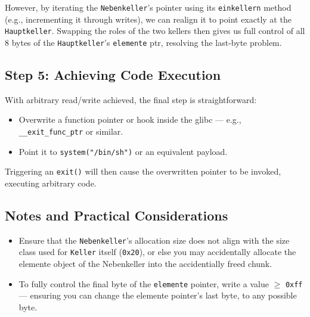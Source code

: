 \documentclass[a4paper,11pt]{article}
\begin{document}
However, by iterating the \texttt{Nebenkeller}'s pointer using its \texttt{einkellern} method (e.g., incrementing it through writes), we can realign it to point exactly at the \texttt{Hauptkeller}. Swapping the roles of the two kellers then gives us full control of all 8 bytes of the \texttt{Hauptkeller}'s \texttt{elemente} ptr, resolving the last-byte problem.

\subsection*{Step 5: Achieving Code Execution}

With arbitrary read/write achieved, the final step is straightforward:
\begin{itemize}
    \item Overwrite a function pointer or hook inside the glibc — e.g., \texttt{\_\_exit\_func\_ptr} or similar.
    \item Point it to \texttt{system("/bin/sh")} or an equivalent payload.
\end{itemize}

Triggering an \texttt{exit()} will then cause the overwritten pointer to be invoked, executing arbitrary code.

\subsection*{Notes and Practical Considerations}

\begin{itemize}
    \item Ensure that the \texttt{Nebenkeller}'s allocation size does not align with the size class used for \texttt{Keller} itself (\texttt{0x20}), or else you may accidentally allocate the elemente object of the Nebenkeller into the accidentially freed chunk.
    \item To fully control the final byte of the \texttt{elemente} pointer, write a value $\geq$ \texttt{0xff} — ensuring you can change the elemente pointer's last byte, to any possible byte.
\end{itemize}
\end{document}
